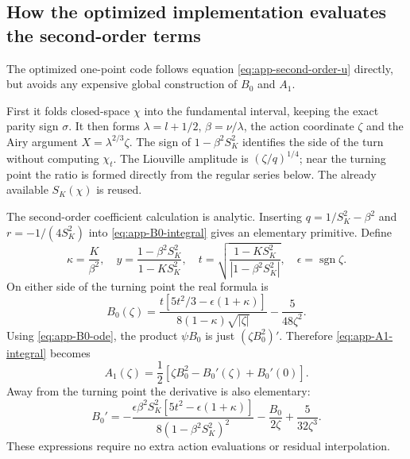 \documentclass[11pt,a4paper]{article}
\newcommand{\SK}{S_K}
\begin{document}
\subsection{How the optimized implementation evaluates the second-order terms}

The optimized one-point code follows equation
\eqref{eq:app-second-order-u} directly, but avoids any expensive global
construction of \(B_0\) and \(A_1\).

First it folds closed-space \(\chi\) into the fundamental interval, keeping the
exact parity sign \(\sigma\).  It then forms
\(\lambda=l+1/2\), \(\beta=\nu/\lambda\), the action coordinate
\(\zeta\) and the Airy argument \(X=\lambda^{2/3}\zeta\).
The sign of \(1-\beta^2\SK^2\) identifies the side of the turn without
computing \(\chi_t\).  The Liouville amplitude is \((\zeta/q)^{1/4}\);
near the turning point the ratio is formed directly from the regular series
below.  The already available \(\SK(\chi)\) is reused.

The second-order coefficient calculation is analytic.  Inserting
\(q=1/\SK^2-\beta^2\) and \(r=-1/(4\SK^2)\) into
\eqref{eq:app-B0-integral} gives an elementary primitive.  Define
\[
 \kappa=\frac{K}{\beta^2},\quad
 y=\frac{1-\beta^2\SK^2}{1-K\SK^2},\quad
 t=\sqrt{\frac{1-K\SK^2}{|1-\beta^2\SK^2|}},\quad
 \epsilon=\operatorname{sgn}\zeta.
\]
On either side of the turning point the real formula is
\begin{equation}
 B_0(\zeta)=
 \frac{t[5t^2/3-\epsilon(1+\kappa)]}{8(1-\kappa)\sqrt{|\zeta|}}
 -\frac{5}{48\zeta^2}.
\end{equation}
Using \eqref{eq:app-B0-ode}, the product \(\psi B_0\) is just
\((\zeta B_0^2)'\).  Therefore \eqref{eq:app-A1-integral} becomes
\begin{equation}
 A_1(\zeta)=\frac12\left[\zeta B_0^2-B_0'(\zeta)+B_0'(0)\right].
\end{equation}
Away from the turning point the derivative is also elementary:
\[
 B_0'=-\frac{\epsilon\beta^2\SK^2[5t^2-\epsilon(1+\kappa)]}
 {8(1-\beta^2\SK^2)^2}-\frac{B_0}{2\zeta}+\frac{5}{32\zeta^3}.
\]
These expressions require no extra action evaluations or residual interpolation.
\end{document}
